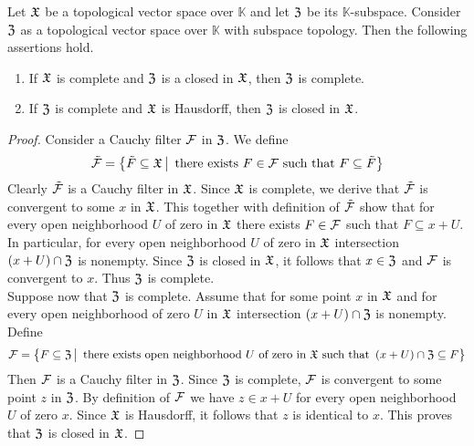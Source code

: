 \begin{theorem}\label{theorem:complete_subspaces_of_topological_vector_spaces}
   Let ${\mathfrak X}$ be a topological vector space over $\mathbb{K}$ and let ${\mathfrak Z}$ be its $\mathbb{K}$-subspace. Consider ${\mathfrak Z}$ as a topological vector space over $\mathbb{K}$ with subspace topology. Then the following assertions hold.
   \begin{enumerate}[label=\emph{\textbf{(\arabic*)}}, leftmargin=*]
      \item If ${\mathfrak X}$ is complete and ${\mathfrak Z}$ is a closed in ${\mathfrak X}$, then ${\mathfrak Z}$ is complete.
      \item If ${\mathfrak Z}$ is complete and ${\mathfrak X}$ is Hausdorff, then ${\mathfrak Z}$ is closed in ${\mathfrak X}$.
   \end{enumerate}
\end{theorem}
\begin{proof}
   Consider a Cauchy filter ${\mathcal F}$ in ${\mathfrak Z}$. We define
   $$\tilde{{\mathcal F}} = \big\{\tilde{F}\subseteq {\mathfrak X}\,\big|\,\mbox{ there exists }F\in {\mathcal F}\mbox{ such that }F\subseteq \tilde{F}\big\}$$
   Clearly $\tilde{{\mathcal F}}$ is a Cauchy filter in ${\mathfrak X}$. Since ${\mathfrak X}$ is complete, we derive that $\tilde{{\mathcal F}}$ is convergent to some $x$ in ${\mathfrak X}$. This together with definition of $\tilde{{\mathcal F}}$ show that for every open neighborhood $U$ of zero in ${\mathfrak X}$ there exists $F \in {\mathcal F}$ such that $F \subseteq x + U$. In particular, for every open neighborhood $U$ of zero in ${\mathfrak X}$ intersection $\left(x + U\right)\cap {\mathfrak Z}$ is nonempty. Since ${\mathfrak Z}$ is closed in ${\mathfrak X}$, it follows that $x \in {\mathfrak Z}$ and ${\mathcal F}$ is convergent to $x$. Thus ${\mathfrak Z}$ is complete.\\
   Suppose now that ${\mathfrak Z}$ is complete. Assume that for some point $x$ in ${\mathfrak X}$ and for every open neighborhood of zero $U$ in ${\mathfrak X}$ intersection $\left(x + U\right) \cap {\mathfrak Z}$ is nonempty. Define
   $${\mathcal F} = \big\{F \subseteq {\mathfrak Z}\,\big|\,\mbox{ there exists open neighborhood }U\mbox{ of zero in }{\mathfrak X}\mbox{ such that }\left(x + U\right) \cap {\mathfrak Z} \subseteq F\big\}$$
   Then ${\mathcal F}$ is a Cauchy filter in ${\mathfrak Z}$. Since ${\mathfrak Z}$ is complete, ${\mathcal F}$ is convergent to some point $z$ in ${\mathfrak Z}$. By definition of ${\mathcal F}$ we have $z \in x + U$ for every open neighborhood $U$ of zero $x$. Since ${\mathfrak X}$ is Hausdorff, it follows that $z$ is identical to $x$. This proves that ${\mathfrak Z}$ is closed in ${\mathfrak X}$.
\end{proof}


